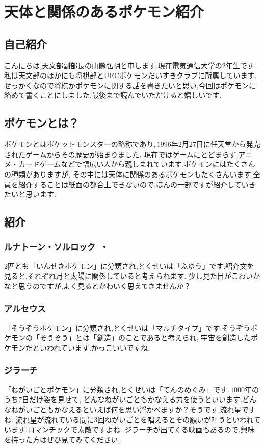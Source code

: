 \documentclass[supernova_2023]{subfiles}
\begin{document}
\chapter{天体と関係のあるポケモン紹介}

\section{自己紹介}
こんにちは,天文部副部長の山際弘明と申します.現在電気通信大学の$2$年生です.私は天文部のほかにも将棋部とUECポケモンだいすきクラブに所属しています.
せっかくなので将棋かポケモンに関する話を書きたいと思い,今回はポケモンに絡めて書くことにしました.最後まで読んでいただけると嬉しいです.
\section{ポケモンとは？}
ポケモンとはポケットモンスターの略称であり,\,$1996$年$2$月$27$日に任天堂から発売されたゲームからその歴史が始まりました.
現在ではゲームにとどまらず,アニメ・カードゲームなどで幅広い人から親しまれています.ポケモンにはたくさんの種類がありますが,
その中には天体に関係のあるポケモンもたくさんいます.全員を紹介することは紙面の都合上できないので,ほんの一部ですが紹介していきたいと思います.
\section{紹介}
\subsection{ルナトーン・ソルロック~・}
$2$匹とも「いんせきポケモン」に分類され,とくせいは「ふゆう」です.紹介文を見ると,それぞれ月と太陽に関係していると考えられます.
少し見た目がこわいかなと思うのですが,よく見るとかわいく思えてきませんか？
\subsection{アルセウス~}
「そうぞうポケモン」に分類され,とくせいは「マルチタイプ」です.そうぞうポケモンの「そうぞう」とは「創造」のことであると考えられ,
宇宙を創造したポケモンだといわれています.かっこいいですね.
\subsection{ジラーチ~}
「ねがいごとポケモン」に分類され,とくせいは「てんのめぐみ」です.\,$1000$年のうち$7$日だけ姿を見せて,
どんなねがいごともかなえる力を使うといいます.どんなねがいごともかなえるといえば何を思い浮かべますか？そうです,流れ星ですね.
流れ星が流れている間に$3$回ねがいごとを唱えるとその願いが叶うといわれています.ロマンチックで素敵ですよね.
ジラーチが出てくる映画もあるので,興味を持った方はぜひ見てみてください.
\end{document}

